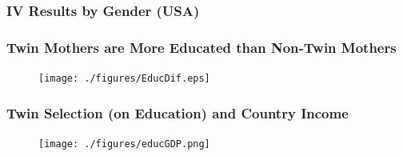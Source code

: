 \documentclass[9pt,letterpaper,subeqn]{beamer}
\begin{document}
\begin{frame}[label=USAGender]
  \frametitle{IV Results by Gender (USA)}

\hyperlink{USAIV}{}
\end{frame}

\frame{
\begin{center}
\Large \textcolor{blue}{Appendix Figures}
\end{center}
}


\begin{frame}[label=EducTwin]
\frametitle{Twin Mothers are More Educated than Non-Twin Mothers}
\begin{figure}[htpb!]
\centering
  \texttt{[image: ./figures/EducDif.eps]}
\end{figure}
\hyperlink{HealthTwin}{}
\end{frame}

\begin{frame}[label=EducGDP]
\frametitle{Twin Selection (on Education) and Country Income}
\begin{figure}[htpb!]
\centering
  \texttt{[image: ./figures/educGDP.png]}
\end{figure}
\hyperlink{HealthGDP}{}
\end{frame}
\end{document}

